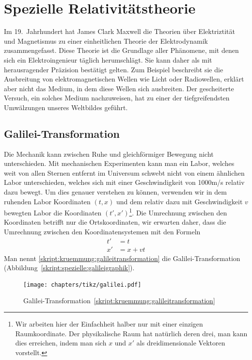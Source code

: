%
%
%

\chapter{Spezielle Relativitätstheorie%
\label{skript:chapter:spezielle}}
\rhead{}
Im 19.~Jahrhundert hat James Clark Maxwell die Theorien
über Elektriztität und Magnetismus zu einer einheitlichen Theorie
der Elektrodynamik zusammengefasst.
Diese Theorie ist die Grundlage aller Phänomene, mit denen sich
ein Elektroingenieur täglich herumschlägt.
Sie kann daher als mit herausragender Präzision bestätigt gelten.
Zum Beispiel beschreibt sie die Ausbreitung von elektromagnetischen
Wellen wie Licht oder Radiowellen, erklärt aber nicht das Medium, in
dem diese Wellen sich ausbreiten.
Der gescheiterte Versuch, ein solches Medium nachzuweisen, hat zu einer
der tiefgreifendsten Umwälzungen unseres Weltbildes geführt.

\section{Galilei-Transformation}
Die Mechanik kann zwischen Ruhe und gleichförmiger Bewegung nicht 
unterschieden.
Mit mechanischen Experimenten kann man ein Labor, welches weit von
allen Sternen entfernt im Universum schwebt nicht von einem ähnlichen
Labor unterschieden, welches sich mit einer Geschwindigkeit von 1000m/s
relativ dazu bewegt.
Um dies genauer verstehen zu können, verwenden wir in dem ruhenden Labor
Koordinaten $(t,x)$ und dem relativ dazu mit Geschwindigkeit $v$ bewegten
Labor die Koordinaten
$(t',x')$\footnote{Wir arbeiten hier der Einfachheit halber nur mit einer
einzigen Raumkoordinate.
Der physikalische Raum hat natürlich deren drei, man kann dies erreichen,
indem man sich $x$ und $x'$ als dreidimensionale Vektoren vorstellt.}.
Die Umrechnung zwischen den Koordinaten betrifft nur die Ortskoordinaten,
wir erwarten daher, dass die Umrechnung zwischen den Koordinatensystemen
mit den Formeln
\begin{equation}
\begin{aligned}
t'&=t\\
x'&=x+vt
\end{aligned}
\label{skript:kruemmung:galileitransformation}
\end{equation}
Man nennt \eqref{skript:kruemmung:galileitransformation} die
Galilei-Transformation (Abbildung~\eqref{skript:spezielle:galileigraphik}).
\begin{figure}
\centering
\texttt{[image: chapters/tikz/galilei.pdf]}
\caption{Galilei-Transformation~\eqref{skript:kruemmung:galileitransformation}
\label{skript:spezielle:galileigraphik}}
\end{figure}

